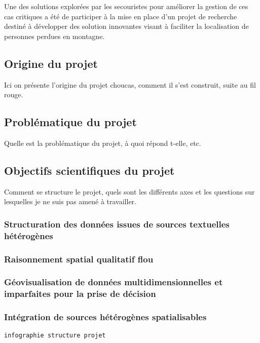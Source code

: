 Une des solutions explorées par les secouristes pour améliorer la
gestion de ces cas critiques a été de participer à la mise en place
d'un projet de recherche destiné à développer des solution innovantes
visant à faciliter la localisation de personnes perdues en montagne.

\subsection{Origine du projet}
\label{subsec:1-2-1}


Ici on présente l'origine du projet choucas, comment il s'est
construit, suite au fil rouge. 

\subsection{Problématique du projet}
\label{subsec:1-2-2}

Quelle est la problématique du projet, à quoi répond t-elle, etc.

\subsection{Objectifs scientifiques du projet}
\label{subsec:1-2-3}

Comment se structure le projet, quels sont les différents axes et les
questions sur lesquelles je ne suis pas amené à travailler.

\subsubsection{Structuration des données issues de sources textuelles
  hétérogènes}

\subsubsection{Raisonnement spatial qualitatif flou}

\subsubsection{Géovisualisation de données multidimensionnelles et
  imparfaites pour la prise de décision}

\subsubsection{Intégration de sources hétérogènes spatialisables}

\texttt{infographie structure projet}
